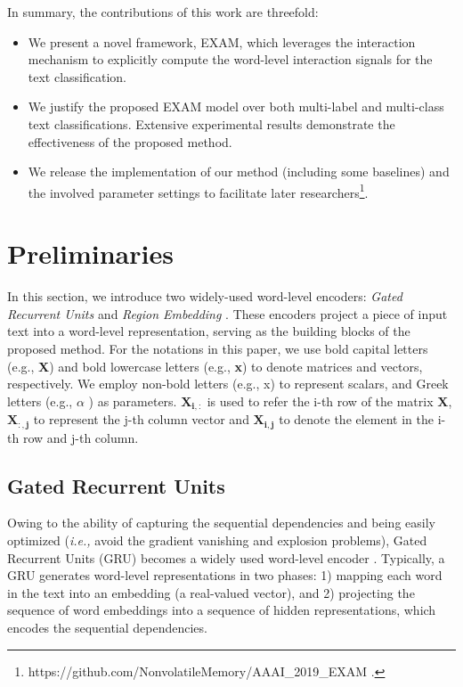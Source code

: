\documentclass[letterpaper]{article} %
\newcommand{\ie}{\emph{i.e., }}
\begin{document}
In summary, the contributions of this work are threefold: 
\begin{itemize}
\item  We present a novel framework, EXAM, which leverages the interaction mechanism to explicitly compute the word-level interaction signals for the text classification.
\item We justify the proposed EXAM model over both multi-label and multi-class text classifications. Extensive experimental results demonstrate the effectiveness of the proposed method.
\item We release the implementation of our method (including some baselines) and the involved parameter settings to facilitate later researchers\footnote{https://github.com/NonvolatileMemory/AAAI\_2019\_EXAM .}.
\end{itemize}

\section{Preliminaries}
In this section, we introduce two widely-used word-level encoders: \textit{Gated Recurrent Units} \cite{GRU} and \textit{Region Embedding} \cite{regionemb}. These encoders project a piece of input text into a word-level representation, serving as the building blocks of the proposed method. 
%
For the notations in this paper,
we use bold capital letters (e.g., \textbf{X}) and bold lowercase letters (e.g., \textbf{x}) to denote matrices and vectors, respectively. We employ non-bold letters (e.g., x) to represent scalars, and Greek letters (e.g., $\alpha$ ) as parameters. $\mathbf{X_{i,:}}$ is used to refer the i-th row of the matrix $\mathbf{X}$, $\mathbf{X_{:,j}}$ to represent the j-th column vector and $\mathbf{X_{i,j}}$ to denote the element in the i-th row and j-th column. 

\subsection{Gated Recurrent Units} 
Owing to the ability of capturing the sequential dependencies and being easily optimized (\ie avoid the gradient vanishing and explosion problems), Gated Recurrent Units (GRU) becomes a widely used word-level encoder \cite{TextRNN,dlstm}. 
Typically, a GRU generates word-level representations in two phases: 1) mapping each word in the text into an embedding (a real-valued vector), and 2) projecting the sequence of word embeddings into a sequence of hidden representations, which encodes the sequential dependencies.
\end{document}
